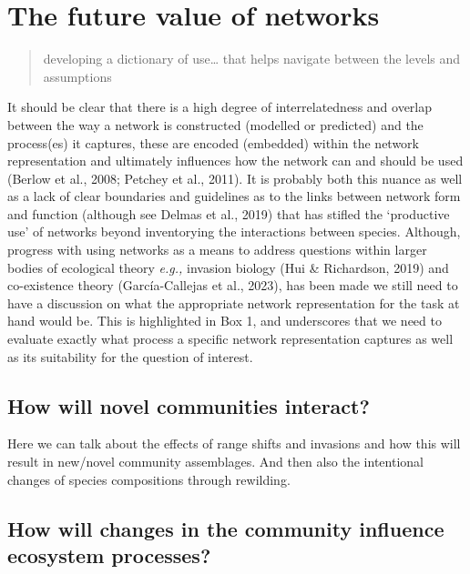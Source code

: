 \documentclass[
]{article}
\begin{document}
\section{The future value of
networks}\label{the-future-value-of-networks}

\begin{quote}
developing a dictionary of use\ldots{} that helps navigate between the
levels and assumptions
\end{quote}

It should be clear that there is a high degree of interrelatedness and
overlap between the way a network is constructed (modelled or predicted)
and the process(es) it captures, these are encoded (embedded) within the
network representation and ultimately influences how the network can and
should be used (Berlow et al., 2008; Petchey et al., 2011). It is
probably both this nuance as well as a lack of clear boundaries and
guidelines as to the links between network form and function (although
see Delmas et al., 2019) that has stifled the `productive use' of
networks beyond inventorying the interactions between species. Although,
progress with using networks as a means to address questions within
larger bodies of ecological theory \emph{e.g.,} invasion biology (Hui \&
Richardson, 2019) and co-existence theory (García-Callejas et al.,
2023), has been made we still need to have a discussion on what the
appropriate network representation for the task at hand would be. This
is highlighted in Box 1, and underscores that we need to evaluate
exactly what process a specific network representation captures as well
as its suitability for the question of interest.

\subsection{How will novel communities
interact?}\label{how-will-novel-communities-interact}

Here we can talk about the effects of range shifts and invasions and how
this will result in new/novel community assemblages. And then also the
intentional changes of species compositions through rewilding.

\subsection{How will changes in the community influence ecosystem
processes?}\label{how-will-changes-in-the-community-influence-ecosystem-processes}
\end{document}
